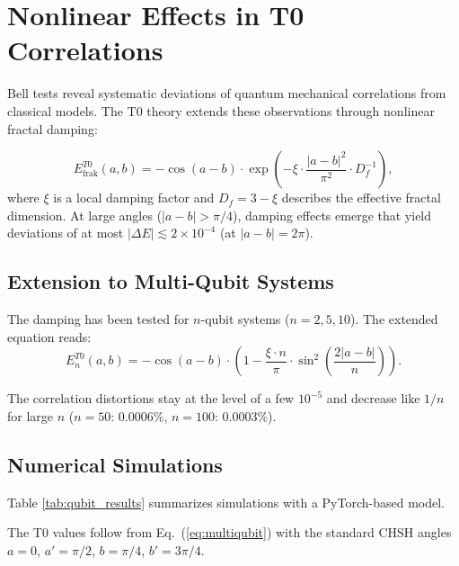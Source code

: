 \section{Nonlinear Effects in T0 Correlations}
\label{sec:nonlinear_extended}

Bell tests reveal systematic deviations of quantum mechanical correlations from classical models. The T0 theory extends these observations through nonlinear fractal damping:

\begin{equation}
E^{T0}_{\text{frak}}(a,b) = -\cos(a-b) \cdot \exp\left(-\xi \cdot \frac{|a-b|^2}{\pi^2} \cdot D_f^{-1}\right),
\label{eq:t0_fractal}
\end{equation}
where $\xi$ is a local damping factor and $D_f = 3 - \xi$ describes the effective fractal dimension. At large angles ($|a-b| > \pi/4$), damping effects emerge that yield deviations of at most $|\Delta E| \lesssim 2 \times 10^{-4}$ (at $|a-b| = 2\pi$).

\subsection{Extension to Multi-Qubit Systems}

The damping has been tested for $n$-qubit systems ($n=2,5,10$). The extended equation reads:
\begin{equation}
E_{n}^{T0}(a,b) = -\cos(a-b) \cdot \left(1 - \frac{\xi \cdot n}{\pi} \cdot \sin^2\left(\frac{2|a-b|}{n}\right)\right).
\label{eq:multiqubit}
\end{equation}

The correlation distortions stay at the level of a few $10^{-5}$ and decrease like $1/n$ for large $n$ ($n = 50$: 0.0006\%, $n = 100$: 0.0003\%).

\subsection{Numerical Simulations}

Table \ref{tab:qubit_results} summarizes simulations with a PyTorch-based model.

\begin{table}[h]
\centering
\caption{Correlation results for multi-qubit tests with T0 damping}
\label{tab:qubit_results}
\end{table}
The T0 values follow from Eq.~(\ref{eq:multiqubit}) with the standard CHSH angles $a = 0$, $a' = \pi/2$, $b = \pi/4$, $b' = 3\pi/4$.

